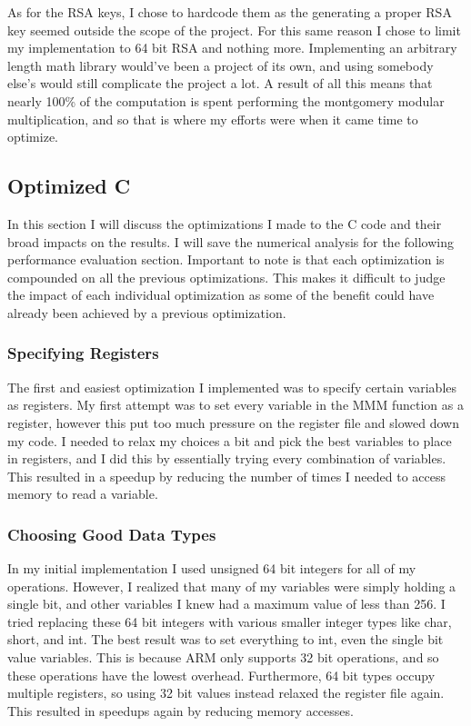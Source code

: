 \documentclass[12pt]{article}
\begin{document}
As for the RSA keys, I chose to hardcode them as the generating a proper RSA key seemed outside the scope of the project. For this same reason I chose to limit my implementation to 64 bit RSA and nothing more. Implementing an arbitrary length math library would've been a project of its own, and using somebody else's would still complicate the project a lot. A result of all this means that nearly 100\% of the computation is spent performing the montgomery modular multiplication, and so that is where my efforts were when it came time to optimize. 

\subsection{Optimized C}

In this section I will discuss the optimizations I made to the C code and their broad impacts on the results. I will save the numerical analysis for the following performance evaluation section. Important to note is that each optimization is compounded on all the previous optimizations. This makes it difficult to judge the impact of each individual optimization as some of the benefit could have already been achieved by a previous optimization.

\subsubsection{Specifying Registers}

The first and easiest optimization I implemented was to specify certain variables as registers. My first attempt was to set every variable in the MMM function as a register, however this put too much pressure on the register file and slowed down my code. I needed to relax my choices a bit and pick the best variables to place in registers, and I did this by essentially trying every combination of variables. This resulted in a speedup by reducing the number of times I needed to access memory to read a variable.

\subsubsection{Choosing Good Data Types}

In my initial implementation I used unsigned 64 bit integers for all of my operations. However, I realized that many of my variables were simply holding a single bit, and other variables I knew had a maximum value of less than 256. I tried replacing these 64 bit integers with various smaller integer types like char, short, and int. The best result was to set everything to int, even the single bit value variables. This is because ARM only supports 32 bit operations, and so these operations have the lowest overhead. Furthermore, 64 bit types occupy multiple registers, so using 32 bit values instead relaxed the register file again. This resulted in speedups again by reducing memory accesses. 
\end{document}
